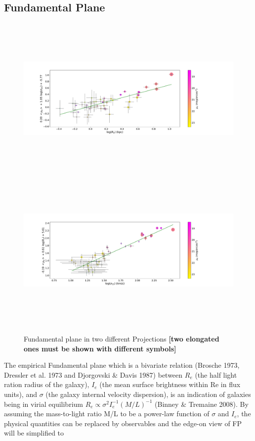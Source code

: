 \documentclass{aa}
\begin{document}
\subsection{Fundamental Plane}
\begin{figure}[!htb]
   \centering
   \includegraphics[width=32cm,height=8cm,keepaspectratio]{../2_pipeline/2_FP_LAD/FP_LAD_x=logR_error_EXC.pdf}
  \includegraphics[width=32cm,height=8cm,keepaspectratio]{../2_pipeline/2_FP_LAD/FP_LAD_x=logS_error_EXC.pdf}
         \caption{Fundamental plane in two different Projections \textbf{[two elongated ones must be shown with different symbols]}}
         \label{fig:FP}
\end{figure}
The empirical Fundamental plane which is a bivariate relation (Brosche 1973, Dressler et al. 1973 and Djorgovski \& Davis 1987) between $R_e$ (the half light ration radius of the galaxy), $I_e$ (the mean surface brightness within Re in flux units), and $\sigma$ (the galaxy internal velocity dispersion), is an indication of galaxies being in virial equilibrium $R_e \propto \sigma^2 I_e^{-1} (M/L)^{-1}$ (Binney \& Tremaine 2008). By assuming the mass-to-light ratio M/L to be a power-law function of $\sigma$ and $I_e$, the physical quantities can be replaced by observables and the edge-on view of FP will be simplified to
\end{document}
